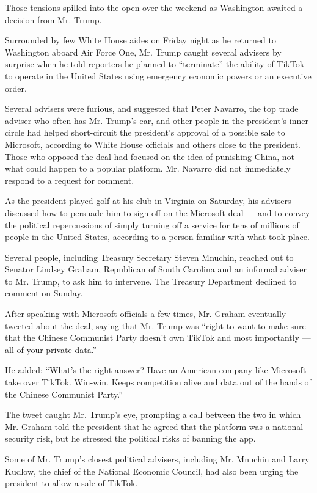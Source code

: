Those tensions spilled into the open over the weekend as Washington
awaited a decision from Mr. Trump.

Surrounded by few White House aides on Friday night as he returned to
Washington aboard Air Force One, Mr. Trump caught several advisers by
surprise when he told reporters he planned to ``terminate'' the ability
of TikTok to operate in the United States using emergency economic
powers or an executive order.

Several advisers were furious, and suggested that Peter Navarro, the top
trade adviser who often has Mr. Trump's ear, and other people in the
president's inner circle had helped short-circuit the president's
approval of a possible sale to Microsoft, according to White House
officials and others close to the president. Those who opposed the deal
had focused on the idea of punishing China, not what could happen to a
popular platform. Mr. Navarro did not immediately respond to a request
for comment.

As the president played golf at his club in Virginia on Saturday, his
advisers discussed how to persuade him to sign off on the Microsoft deal
--- and to convey the political repercussions of simply turning off a
service for tens of millions of people in the United States, according
to a person familiar with what took place.

Several people, including Treasury Secretary Steven Mnuchin, reached out
to Senator Lindsey Graham, Republican of South Carolina and an informal
adviser to Mr. Trump, to ask him to intervene. The Treasury Department
declined to comment on Sunday.

After speaking with Microsoft officials a few times, Mr. Graham
eventually tweeted about the deal, saying that Mr. Trump was ``right to
want to make sure that the Chinese Communist Party doesn't own TikTok
and most importantly --- all of your private data.''

He added: ``What's the right answer? Have an American company like
Microsoft take over TikTok. Win-win. Keeps competition alive and data
out of the hands of the Chinese Communist Party.''

The tweet caught Mr. Trump's eye, prompting a call between the two in
which Mr. Graham told the president that he agreed that the platform was
a national security risk, but he stressed the political risks of banning
the app.

Some of Mr. Trump's closest political advisers, including Mr. Mnuchin
and Larry Kudlow, the chief of the National Economic Council, had also
been urging the president to allow a sale of TikTok.

